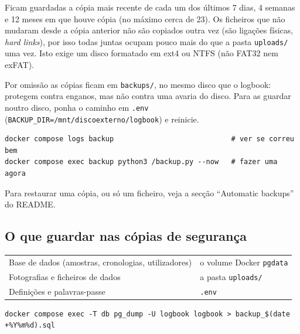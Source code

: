 \documentclass[11pt,a4paper]{article}
\begin{document}
Ficam guardadas a cópia mais recente de cada um dos últimos 7 dias, 4 semanas
e 12 meses em que houve cópia (no máximo cerca de 23). Os ficheiros que não
mudaram desde a cópia anterior não são copiados outra vez (são ligações
físicas, \emph{hard links}), por isso todas juntas ocupam pouco mais do que a
pasta \texttt{uploads/} uma vez. Isto exige um disco formatado em ext4 ou NTFS
(não FAT32 nem exFAT).

Por omissão as cópias ficam em \texttt{backups/}, no mesmo disco que o
logbook: protegem contra enganos, mas não contra uma avaria do disco. Para as
guardar noutro disco, ponha o caminho em \texttt{.env}
(\texttt{BACKUP\_DIR=/mnt/discoexterno/logbook}) e reinicie.

\begin{tcolorbox}[colback=gray!5,colframe=gray!40,boxrule=0.4pt,arc=1pt]
\footnotesize
\begin{verbatim}
docker compose logs backup                            # ver se correu bem
docker compose exec backup python3 /backup.py --now   # fazer uma agora
\end{verbatim}
\end{tcolorbox}

Para restaurar uma cópia, ou só um ficheiro, veja a secção ``Automatic
backups'' do README.

\subsection{O que guardar nas cópias de segurança}

\begin{center}
\begin{tabular}{@{}ll@{}}
\toprule
Base de dados (amostras, cronologias, utilizadores) & o volume Docker \texttt{pgdata} \\
Fotografias e ficheiros de dados                    & a pasta \texttt{uploads/} \\
Definições e palavras-passe                         & \texttt{.env} \\
\bottomrule
\end{tabular}
\end{center}

\begin{tcolorbox}[colback=gray!5,colframe=gray!40,boxrule=0.4pt,arc=1pt]
\footnotesize
\begin{verbatim}
docker compose exec -T db pg_dump -U logbook logbook > backup_$(date +%Y%m%d).sql
\end{verbatim}
\end{tcolorbox}
\end{document}
